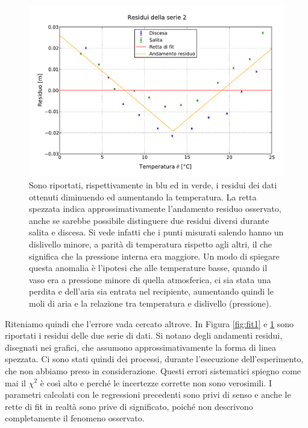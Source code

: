 \begin{figure}[p]
    \centering
    \includegraphics[width=117mm]{immagini/fit2.pdf}
    \caption{Sono riportati, rispettivamente in blu ed in verde, i residui dei dati ottenuti diminuendo ed aumentando la temperatura.
    La retta spezzata indica approssimativamente l'andamento residuo osservato, anche se sarebbe possibile distinguere due residui
    diversi durante salita e discesa. Si vede infatti che i punti misurati salendo hanno un dislivello minore, a parità di temperatura
    rispetto agli altri, il che significa che la pressione interna era maggiore. Un modo di spiegare questa anomalia è l'ipotesi che
    alle temperature basse, quando il vaso era a pressione minore di quella atmosferica, ci sia stata una perdita e dell'aria sia entrata
    nel recipiente, aumentando quindi le moli di aria e la relazione tra temperatura e dislivello (pressione).}
    \label{fig:fit2}
\end{figure}

Riteniamo quindi che l'errore vada cercato altrove. In Figura \ref{fig:fit1} e \ref{fig:fit2} sono riportati i residui delle due
serie di dati. Si notano degli andamenti residui, disegnati nei grafici, che assumono approssimativamente la forma di linea spezzata.
Ci sono stati quindi dei processi, durante l'esecuzione dell'esperimento, che non abbiamo preso in considerazione.
Questi errori sistematici spiegno come mai il $\chi^2$ è così alto e perché le incertezze corrette non sono verosimili. I parametri calcolati con
le regressioni precedenti sono privi di senso e anche le rette di fit in realtà sono prive di significato, poiché non
descrivono completamente il fenomeno osservato.
